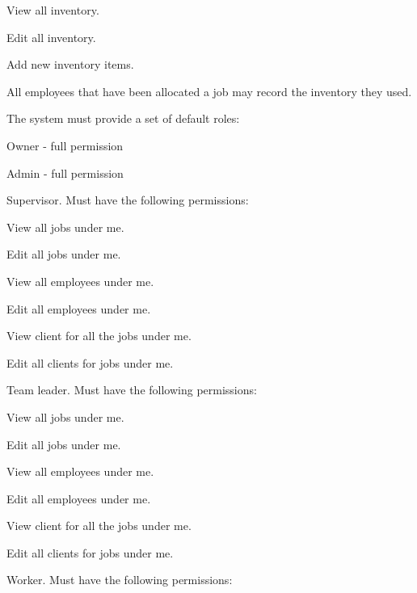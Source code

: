 \documentclass{article}
\begin{document}
\begin{list}{R.}{}
\begin{list}{R.}{}
\begin{list}{R...}{}
				\item View all inventory.
				\item Edit all inventory.
				\item Add new inventory items.
				\item All employees that have been allocated a job may record the inventory they used.
			\end{list}
		\end{list} 
		\item The system must provide a set of default roles:
		\begin{list}{R.}{}
			\item Owner - full permission
			\item Admin - full permission
			\item Supervisor. Must have the following permissions:
			\begin{list}{R...}{}
				\item View all jobs under me.
				\item Edit all jobs under me.
				\item View all employees under me.
				\item Edit all employees under me.
				\item View client for all the jobs under me.
				\item Edit all clients for jobs under me.
			\end{list}
			\item Team leader. Must have the following permissions:
			\begin{list}{R...}{}
				\item View all jobs under me.
				\item Edit all jobs under me.
				\item View all employees under me.
				\item Edit all employees under me.
				\item View client for all the jobs under me.
				\item Edit all clients for jobs under me.
			\end{list}
			\item Worker. Must have the following permissions:
			\begin{list}{R...}{}

\end{list}
\end{list}
\end{list}
\end{document}
